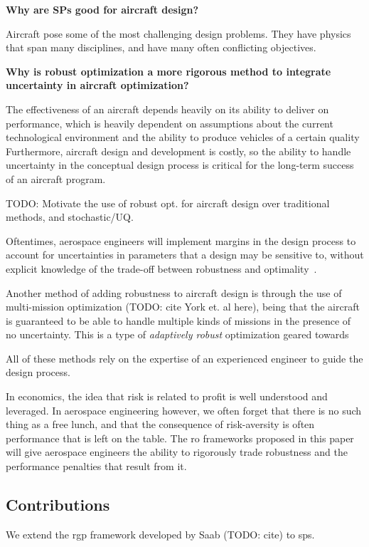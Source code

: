 \textbf{Why are SPs good for aircraft design?}

Aircraft pose some of the most challenging design problems. They have physics that span many disciplines,
and have many often conflicting objectives.

\textbf{Why is robust optimization a more rigorous method to integrate uncertainty in aircraft optimization?}

The effectiveness of an aircraft depends heavily on its
ability to deliver on performance, which is heavily dependent on assumptions about the
current technological environment and the ability to produce vehicles of a certain quality
Furthermore, aircraft design and development is costly, so the ability to handle uncertainty in
the conceptual design process is critical for the long-term success of an aircraft program.

TODO: Motivate the use of robust opt. for aircraft design over traditional methods, and stochastic/UQ.

Oftentimes, aerospace engineers will implement
margins in the design process to account for uncertainties in parameters that a design may be sensitive to,
without explicit knowledge of the trade-off between robustness and optimality~\cite{yao2011}.

Another method of adding robustness to aircraft design is through the use of multi-mission
optimization (TODO: cite York et. al here), being that the aircraft is guaranteed to be able to handle
multiple kinds of missions in the presence of no uncertainty. This is a type of \textit{adaptively
robust} optimization geared towards

All of these methods rely on the expertise of an experienced engineer to guide the design process.

In economics, the idea that risk is related to profit is well understood and leveraged.
In aerospace engineering however, we often forget that there is no such thing as a free lunch,
and that the consequence of risk-aversity
is often performance that is left on the table. The \gls{ro} frameworks proposed in this paper will
give aerospace engineers the ability to rigorously trade robustness and the performance penalties
that result from it.

\subsection{Contributions}

We extend the \gls{rgp} framework developed by Saab (TODO: cite) to \gls{sp}s.

